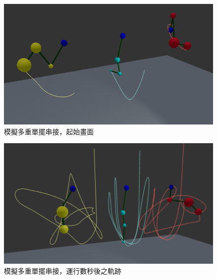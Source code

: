 \documentclass{article}
\begin{document}
\begin{figure}[!ht]
  \centering
  \includegraphics[width=0.6\linewidth]{figures/pendulums.png}
  \caption{模擬多重單擺串接，起始畫面}
\end{figure}


\begin{figure}[!ht]
  \centering
  \includegraphics[width=0.6\linewidth]{figures/pendulums1.png}
  \caption{模擬多重單擺串接，運行數秒後之軌跡}
\end{figure}



\clearpage
\printbibliography[title={}]
\end{document}
